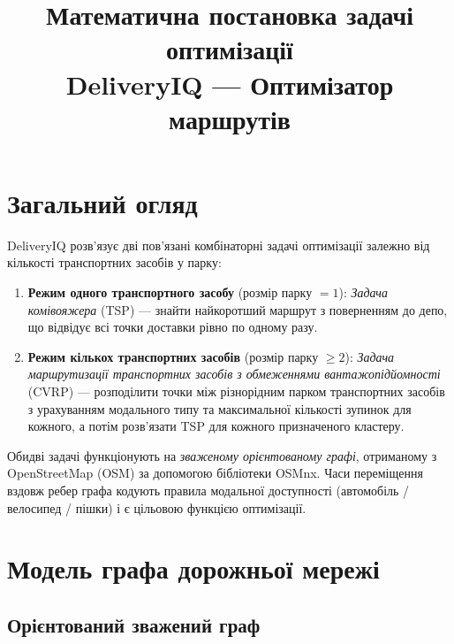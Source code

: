 \documentclass[12pt, a4paper]{article}
\title{%
  \textbf{Математична постановка задачі оптимізації}\\[0.5em]
  \large DeliveryIQ --- Оптимізатор маршрутів
}
\author{}
\date{}
\theoremstyle{definition}
\begin{document}
\maketitle
\tableofcontents
\newpage

\section{Загальний огляд}

DeliveryIQ розв'язує дві пов'язані комбінаторні задачі оптимізації залежно
від кількості транспортних засобів у парку:

\begin{enumerate}
  \item \textbf{Режим одного транспортного засобу} (розмір парку $= 1$):
        \emph{Задача комівояжера} (TSP) --- знайти найкоротший маршрут з
        поверненням до депо, що відвідує всі точки доставки рівно по одному разу.

  \item \textbf{Режим кількох транспортних засобів} (розмір парку $\geq 2$):
        \emph{Задача маршрутизації транспортних засобів з обмеженнями
        вантажопідйомності} (CVRP) --- розподілити точки між різнорідним парком
        транспортних засобів з урахуванням модального типу та максимальної
        кількості зупинок для кожного, а потім розв'язати TSP для кожного
        призначеного кластеру.
\end{enumerate}

Обидві задачі функціонують на \emph{зваженому орієнтованому графі}, отриманому
з OpenStreetMap (OSM) за допомогою бібліотеки OSMnx. Часи переміщення вздовж
ребер графа кодують правила модальної доступності (автомобіль / велосипед /
пішки) і є цільовою функцією оптимізації.

\section{Модель графа дорожньої мережі}

\subsection{Орієнтований зважений граф}
\end{document}
